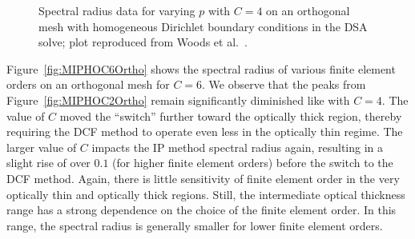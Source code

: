 \documentclass[12pt]{article}
\begin{document}
\begin{figure}[!hbt]
\centering
{}
\caption{Spectral radius data for varying $p$ with $C=4$ on an orthogonal mesh with homogeneous Dirichlet boundary conditions in the DSA solve; plot reproduced from Woods et al.~\cite{WoodsDSA}.}
\label{fig:MIPHOC4Ortho}
\end{figure}

Figure~\ref{fig:MIPHOC6Ortho} shows the spectral radius of various finite element orders on an orthogonal mesh for $C=6$. We observe that the peaks from Figure~\ref{fig:MIPHOC2Ortho} remain significantly diminished like with $C=4$. The value of $C$ moved the ``switch'' further toward the optically thick region, thereby requiring the DCF method to operate even less in the optically thin regime. The larger value of $C$ impacts the IP method spectral radius again, resulting in a slight rise of over $0.1$ (for higher finite element orders) before the switch to the DCF method. Again, there is little sensitivity of finite element order in the very optically thin and optically thick regions. Still, the intermediate optical thickness range has a strong dependence on the choice of the finite element order. In this range, the spectral radius is generally smaller for lower finite element orders.
\end{document}
